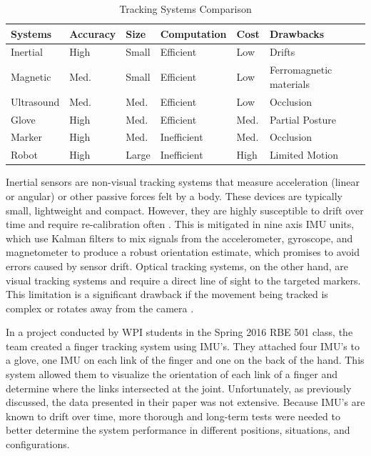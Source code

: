 \documentclass[letterpaper, 10 pt, conference]{ieeeconf}  %
\begin{document}
\begin{table}[h]
	\scriptsize
	\caption{Tracking Systems Comparison \cite{Zhou}}
	\label{table:trackingSystems}
	\begin{center}
    \renewcommand{\arraystretch}{1.5}
	\begin{tabular}{|p{1.0cm}|p{1cm}|p{0.6cm}|p{1.4cm}|p{0.6cm}|p{1.45cm}|}
	\hline
	\textbf{Systems} & \textbf{Accuracy} & \textbf{Size} & \textbf{Computation} & \textbf{Cost} & \textbf{Drawbacks} \\ \hline
	Inertial & High & Small & Efficient & Low & Drifts \\ \hline
    Magnetic & Med. & Small & Efficient & Low & Ferromagnetic materials \\ \hline
    Ultrasound & Med. & Med. & Efficient & Low & Occlusion \\ \hline
    Glove & High & Med. & Efficient & Med. & Partial Posture \\ \hline
    Marker & High & Med. & Inefficient & Med. & Occlusion \\ \hline 
    Robot & High & Large & Inefficient & High & Limited Motion \\ \hline
	\end{tabular}
	\end{center}
\end{table}

Inertial sensors are non-visual tracking systems that measure acceleration (linear or angular) or other passive forces felt by a body. These devices are typically small, lightweight and compact. However, they are highly susceptible to drift over time and require re-calibration often \cite{Zhou}. This is mitigated in nine axis IMU units, which use Kalman filters to mix signals from the accelerometer, gyroscope, and magnetometer to produce a robust orientation estimate, which promises to avoid errors caused by sensor drift. Optical tracking systems, on the other hand, are visual tracking systems and require a direct line of sight to the targeted markers. This limitation is a significant drawback if the movement being tracked is complex or rotates away from the camera \cite{Zhou}.

In a project conducted by WPI students in the Spring 2016 RBE 501 class, the team created a finger tracking system using IMU’s.  They attached four IMU's to a glove, one IMU on each link of the finger and one on the back of the hand. This system allowed them to visualize the orientation of each link of a finger and determine where the links intersected at the joint.
Unfortunately, as previously discussed, the data presented in their paper was not extensive.  Because IMU’s are known to drift over time, more thorough and long-term tests were needed to better determine the system performance in different positions, situations, and configurations.
\end{document}
